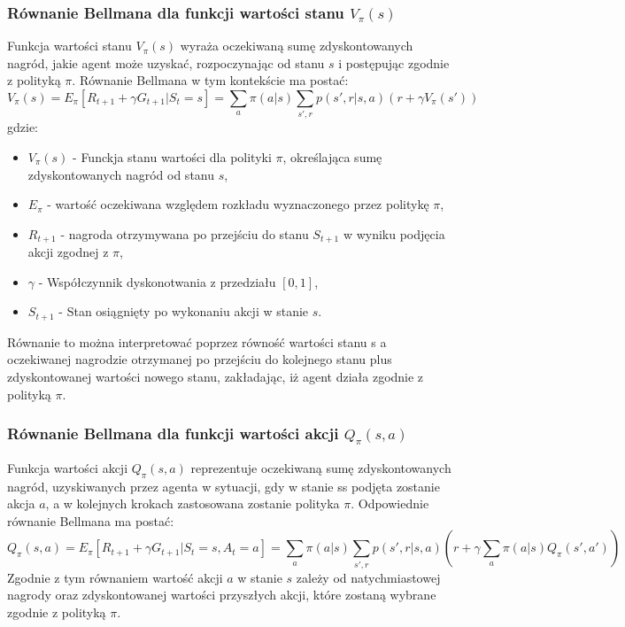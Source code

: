 \documentclass[a4paper, 12pt]{article}
\numberwithin{equation}{section}
\begin{document}
    \subsubsection{Równanie Bellmana dla funkcji wartości stanu \( V_\pi(s) \)}
    Funkcja wartości stanu \( V_\pi(s) \) wyraża oczekiwaną sumę zdyskontowanych nagród, jakie agent może uzyskać, rozpoczynając od stanu \( s \) i postępując zgodnie z polityką \( \pi \). 
    Równanie Bellmana w tym kontekście ma postać:
    \begin{equation}
    V_\pi(s) = E_\pi[R_{t+1} + \gamma G_{t+1}|S_t = s] = \sum_{a} \pi(a|s) \sum_{s',r} p(s',r|s,a) (r + \gamma V_\pi(s'))
    \end{equation}
    gdzie:
    \begin{itemize}
        \item \( V_\pi(s) \) - Funckja stanu wartości dla polityki \( \pi \), określająca sumę zdyskontowanych nagród od stanu \( s \),
        \item \( E_\pi \) - wartość oczekiwana względem rozkładu wyznaczonego przez politykę \( \pi \),
        \item \( R_{t+1} \) - nagroda otrzymywana po przejściu do stanu \( S_{t+1} \) w wyniku podjęcia akcji zgodnej z \( \pi \), 
        \item \( \gamma \) - Współczynnik dyskonotwania z przedziału \( [0,1] \),
        \item \( S_{t+1} \) - Stan osiągnięty po wykonaniu akcji w stanie \( s \).
    \end{itemize}
    Równanie to można interpretować poprzez równość wartości stanu s a oczekiwanej nagrodzie otrzymanej po przejściu do kolejnego stanu plus zdyskontowanej wartości nowego stanu,
    zakładając, iż agent działa zgodnie z polityką \( \pi \).
    \subsubsection{Równanie Bellmana dla funkcji wartości akcji \( Q_\pi(s,a) \)}
    Funkcja wartości akcji \( Q_\pi(s,a) \) reprezentuje oczekiwaną sumę zdyskontowanych nagród, uzyskiwanych przez agenta w sytuacji, gdy w stanie ss podjęta zostanie akcja \( a \), a w kolejnych krokach zastosowana zostanie polityka \( \pi \). Odpowiednie równanie Bellmana ma postać:
    \begin{equation}
    Q_\pi(s,a) = E_\pi[R_{t+1} + \gamma G_{t+1}|S_t = s, A_t = a] = \sum_{a} \pi(a|s) \sum_{s',r} p(s',r|s,a)(r + \gamma \sum_{a} \pi(a|s)Q_\pi(s',a'))
    \end{equation}
    Zgodnie z tym równaniem wartość akcji \( a \) w stanie \( s \) zależy od natychmiastowej nagrody oraz zdyskontowanej wartości przyszłych akcji, które zostaną wybrane zgodnie z polityką \( \pi \).
\end{document}
